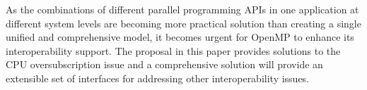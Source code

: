 


As the combinations of different parallel programming APIs in one application
at different system levels are becoming more
practical solution than creating a single unified and 
comprehensive model, it becomes urgent for OpenMP to enhance its 
interoperability support.
The proposal in this paper provides 
solutions to the CPU oversubscription issue and a comprehensive solution will provide 
an extensible set of interfaces for addressing other interoperability issues. 








